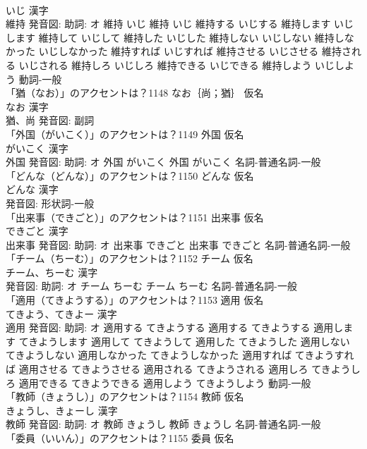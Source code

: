 \documentclass[8pt]{extreport}
\begin{document}
\begin{CJK}{UTF8}{min}
\\	いじ 漢字　
\\	維持 発音図: 助詞: オ	維持 いじ		維持 いじ 維持する いじする 維持します いじします 維持して いじして 維持した いじした 維持しない いじしない 維持しなかった いじしなかった 維持すれば いじすれば 維持させる いじさせる 維持される いじされる 維持しろ いじしろ 維持できる いじできる 維持しよう いじしよう				動詞-一般 
\\	「猶（なお）」のアクセントは？1148	なお｛尚；猶｝ 仮名　
\\	なお 漢字　
\\	猶、尚 発音図:							副詞 
\\	「外国（がいこく）」のアクセントは？1149	外国 仮名　
\\	がいこく 漢字　
\\	外国 発音図: 助詞: オ	外国 がいこく		外国 がいこく				名詞-普通名詞-一般 
\\	「どんな（どんな）」のアクセントは？1150	どんな 仮名　
\\	どんな 漢字　
\\	発音図:							形状詞-一般 
\\	「出来事（できごと）」のアクセントは？1151	出来事 仮名　
\\	できごと 漢字　
\\	出来事 発音図: 助詞: オ	出来事 できごと		出来事 できごと				名詞-普通名詞-一般 
\\	「チーム（ちーむ）」のアクセントは？1152	チーム 仮名　
\\	チーム、ちーむ 漢字　
\\	発音図: 助詞: オ	チーム ちーむ		チーム ちーむ				名詞-普通名詞-一般 
\\	「適用（てきようする）」のアクセントは？1153	適用 仮名　
\\	てきよう、てきよー 漢字　
\\	適用 発音図: 助詞: オ	適用する てきようする		適用する てきようする 適用します てきようします 適用して てきようして 適用した てきようした 適用しない てきようしない 適用しなかった てきようしなかった 適用すれば てきようすれば 適用させる てきようさせる 適用される てきようされる 適用しろ てきようしろ 適用できる てきようできる 適用しよう てきようしよう				動詞-一般 
\\	「教師（きょうし）」のアクセントは？1154	教師 仮名　
\\	きょうし、きょーし 漢字　
\\	教師 発音図: 助詞: オ	教師 きょうし		教師 きょうし				名詞-普通名詞-一般 
\\	「委員（いいん）」のアクセントは？1155	委員 仮名　

\end{CJK}
\end{document}
